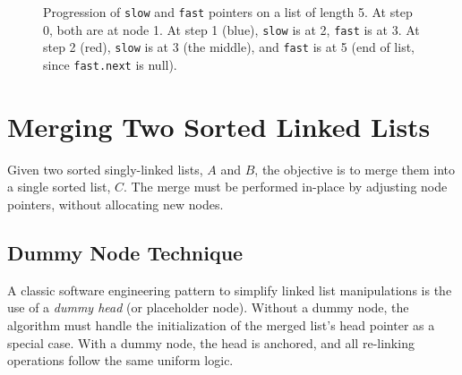 \documentclass[10pt,journal,compsoc,onecolumn]{IEEEtran}
\begin{document}
\begin{figure}[htbp]
\centering
{}
\caption{Progression of \texttt{slow} and \texttt{fast} pointers on a list of length 5. At step 0, both are at node 1. At step 1 (blue), \texttt{slow} is at 2, \texttt{fast} is at 3. At step 2 (red), \texttt{slow} is at 3 (the middle), and \texttt{fast} is at 5 (end of list, since \texttt{fast.next} is null).}
\label{fig:fast_slow}
\end{figure}

\section{Merging Two Sorted Linked Lists}
\label{sec:merging}
Given two sorted singly-linked lists, $A$ and $B$, the objective is to merge them into a single sorted list, $C$. The merge must be performed in-place by adjusting node pointers, without allocating new nodes.

\subsection{Dummy Node Technique}
A classic software engineering pattern to simplify linked list manipulations is the use of a \textit{dummy head} (or placeholder node). Without a dummy node, the algorithm must handle the initialization of the merged list's head pointer as a special case. With a dummy node, the head is anchored, and all re-linking operations follow the same uniform logic.
\end{document}
